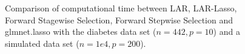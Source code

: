 \begin{frame}
\begin{figure}[!htbp]
\begin{subfigure}[t]{0.49\textwidth}
    \end{subfigure}
    \caption{Comparison of computational time between LAR, LAR-Lasso, Forward Stagewise Selection, Forward Stepwise Selection and glmnet.lasso with the diabetes data set ($n=442,p=10$) and a simulated data set ($n=1e4,p=200$).}
\end{figure}

\end{frame}